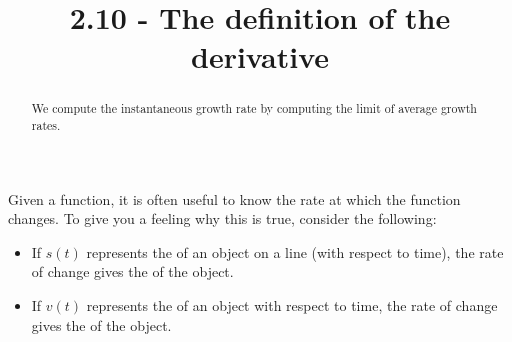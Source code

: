 \documentclass{ximera}
\title{2.10 - The definition of the derivative}
\begin{document}
\begin{abstract}
We compute the instantaneous growth rate by computing the limit of
average growth rates.
\end{abstract}
\maketitle


Given a function, it is often useful to know the rate at which the
function changes. To give you a feeling why this is true, consider the
following:
\begin{itemize}
 
\item If $s(t)$ represents the  of an object on a line (with respect to time), the rate of change gives
  the  of the object.
\item If $v(t)$ represents the  of an object with respect to
  time, the rate of change gives the  of the object.
\end{itemize}
\begin{comment}
\item If $R(x)$ represents the revenue generated by selling $x$
  objects, the rate of change gives us the \dfn{marginal revenue},
  meaning the additional revenue generated by selling one additional
  unit. Note, there is an implicit assumption that $x$ is quite large
  compared to $1$.
\item If $C(x)$ represents the cost to produce $x$ objects, the rate
  of change gives us the \dfn{marginal cost}, meaning the
  additional cost generated by selling one additional unit. Again,
  there is an implicit assumption that $x$ is quite large compared to
  $1$.
\item The rate of change of a function can help us approximate a
  complicated function with a simple function.
\item The rate of change of a function can be used to help us solve
  equations that we would not be able to solve via other methods.
  \end{comment}
  


\end{document}
